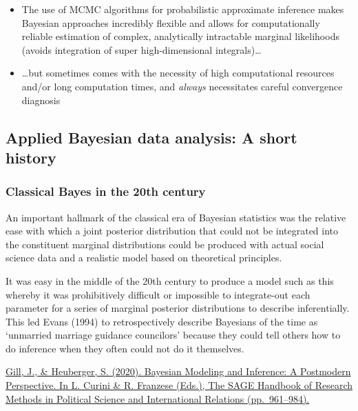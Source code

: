 \documentclass[
  11pt,
]{article}
\providecommand{\tightlist}{%
  \setlength{\itemsep}{0pt}\setlength{\parskip}{0pt}}
\begin{document}
\begin{itemize}
\tightlist
\item
  The use of MCMC algorithms for probabilistic approximate inference
  makes Bayesian approaches incredibly flexible and allows for
  computationally reliable estimation of complex, analytically
  intractable marginal likelihoods (avoids integration of super
  high-dimensional integrals)\ldots{}
\item
  \ldots but sometimes comes with the necessity of high computational
  resources and/or long computation times, and \emph{always} necessitates
  careful convergence diagnosis
\end{itemize}

\hypertarget{applied-bayesian-data-analysis-a-short-history}{%
\subsection{Applied Bayesian data analysis: A short history}\label{applied-bayesian-data-analysis-a-short-history}}

\hypertarget{classical-bayes-in-the-20th-century}{%
\subsubsection{Classical Bayes in the 20th century}\label{classical-bayes-in-the-20th-century}}

An important hallmark of the classical era of Bayesian statistics was the relative ease with which a joint posterior distribution that could not be integrated into the constituent marginal distributions could be produced with actual social science data and a realistic model based on theoretical principles.

It was easy in the middle of the 20th century to produce a model such as this whereby it was prohibitively difficult or impossible to integrate-out each parameter for a series of marginal posterior distributions to describe inferentially. This led Evans (1994) to retrospectively describe Bayesians of the time as `unmarried marriage guidance councilors' because they could tell others how to do inference when they often could not do it themselves.

\href{https://jeffgill.org/wp-content/uploads/2021/04/curini_franzese_v2_chp50_1pp_01.pdf}{Gill, J., \& Heuberger, S. (2020). Bayesian Modeling and Inference: A Postmodern Perspective. In L. Curini \& R. Franzese (Eds.), The SAGE Handbook of Research Methods in Political Science and International Relations (pp.~961--984).}
\end{document}
